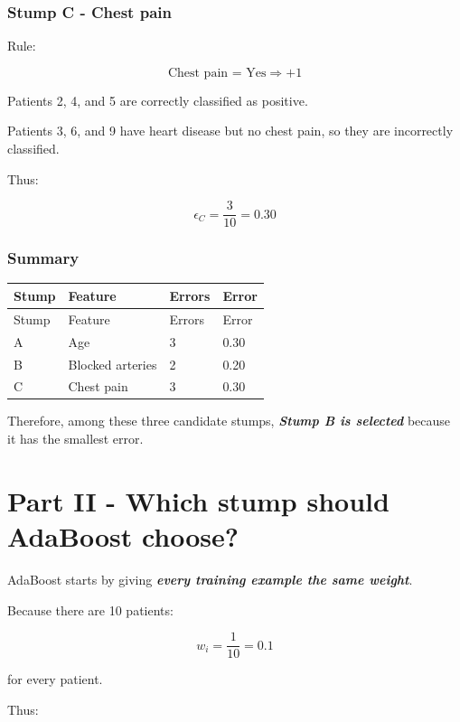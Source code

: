 \documentclass[10pt]{article}
\begin{document}
\subsubsection*{Stump C - Chest pain}
Rule:

\[
\text{Chest pain = Yes} \Rightarrow +1
\]

Patients 2, 4, and 5 are correctly classified as positive.

Patients 3, 6, and 9 have heart disease but no chest pain, so they are incorrectly classified.

Thus:

\[
{\epsilon_C=\frac{3}{10}=0.30}
\]

\subsubsection*{Summary}
\begingroup
\small
\setlength{\tabcolsep}{4pt}
\begin{longtable}{l|l|l|l}
Stump & Feature & Errors & Error \\[1.5pt]
\hline
\endfirsthead
Stump & Feature & Errors & Error \\[1.5pt]
\hline
\endhead
A & Age & 3 & 0.30 \\[1.5pt]
B & Blocked arteries & 2 & 0.20 \\[1.5pt]
C & Chest pain & 3 & 0.30 \\[1.5pt]
\end{longtable}
\endgroup
Therefore, among these three candidate stumps, \textbf{\textit{Stump B is selected}} because it has the smallest error.

\par\endgroup

\clearpage
\section*{Part II - Which stump should AdaBoost choose?}
AdaBoost starts by giving \textbf{\textit{every training example the same weight}}.

Because there are 10 patients:

\[
w_i=\frac{1}{10}=0.1
\]

for every patient.

Thus:
\end{document}
